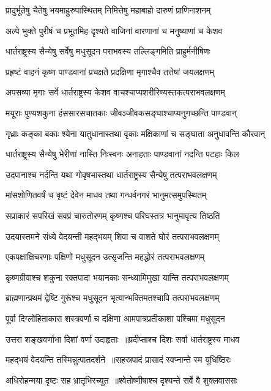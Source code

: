 \twolineshloka
{प्रादुर्भूतेषु चैतेषु भयमाहुरुपास्थितम्}
{निमित्तेषु महाबाहो दारुणं प्राणिनाशनम्}


\twolineshloka
{अल्पे भुक्ते पुरीषं च प्रभूतमिह दृश्यते}
{वाजिनां वारणानां च मनुष्याणां च केशव}


\twolineshloka
{धार्तराष्ट्रस्य सैन्येषु सर्वेषु मधुसूदन}
{पराभवस्य तल्लिङ्गमिति प्राहुर्मनीषिणः}


\twolineshloka
{प्रहृष्टं वाहनं कृष्ण पाण्डवानां प्रचक्षते}
{प्रदक्षिणा मृगाश्चैव तत्तेषां जयलक्षणम्}


\twolineshloka
{अपसव्या मृगाः सर्वे धार्तराष्ट्रस्य केशव}
{वाचश्चाप्यशरीरिण्यस्तकत्पराभवलक्षणम्}


\twolineshloka
{मयूराः पुण्यशकुना हंससारसचातकाः}
{जीवञ्जीवकसङ्घाश्चाप्यनुगच्छन्ति पाण्डवान्}


\twolineshloka
{गृध्राः कङ्का बकाः श्येना यातुधानास्तथा वृकाः}
{मक्षिकाणां च सङ्घाता अनुधावन्ति कौरवान्}


\twolineshloka
{धार्तराष्ट्रस्य सैन्येषु भेरीणां नास्ति निःस्वनः}
{अनाहताः पाण्डवानां नदन्ति पटहाः किल}


\twolineshloka
{उदपानाश्च नर्दन्ति यथा गोवृषभास्तथा}
{धार्तराष्ट्रस्य सैन्येषु तत्पराभवलक्षणम्}


\twolineshloka
{मांसशोणितवर्षं च वृष्टं देवेन माधव}
{तथा गन्धर्वनगरं भानुमत्समुपस्थितम्}


\twolineshloka
{सप्राकारं सपरिखं सवप्रं चारुतोरणम्}
{कृष्णश्च परिघस्तत्र भानुमावृत्य तिष्ठति}


\twolineshloka
{उदयास्तमने संध्ये वेदयन्ती महद्भयम्}
{शिवा च वाशते घोरं तत्पराभवलक्षणम्}


\twolineshloka
{एकपक्षाक्षिचरणाः पक्षिणो मधुसूदन}
{उत्सृजन्ति महद्धोरं तत्पराभवलक्षणम्}


\twolineshloka
{कृष्णग्रीवाश्च शकुना रक्तपादा भयानकाः}
{सन्ध्यामिमुखा यान्ति तत्पराभवलक्षणम्}


\twolineshloka
{ब्राह्मणान्प्रथमं द्वेष्टि गुरूंश्च मधुसूदन}
{भृत्यान्भक्तिमतश्चापि तत्पराभवलक्षणम्}


\threelineshloka
{पूर्वा दिग्लोहिताकारा शस्त्रवर्णा च दक्षिणा}
{आमपात्रप्रतीकाशा पश्चिमा मधुसूदन}
{}


\twolineshloka
{उत्तरा शङ्खवर्णाभा दिशां वर्णा उदाहृताः ॥प्रदीप्ताश्च दिशः सर्वा धार्तराष्ट्रस्य माधव}
{}


\twolineshloka
{महद्भयं वेदयन्ति तस्मिन्नुत्पातदर्शने ॥सहस्रपादं प्रासादं स्वप्नान्ते स्म युधिष्ठिरः}
{}


\twolineshloka
{अधिरोहन्मया दृष्टः सह भ्रातृभिरच्युत ॥श्वेतोष्णीषाश्च दृश्यन्ते सर्वे वै शुक्लवाससः}
{}


